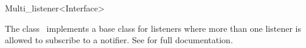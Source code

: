 

\begin{ccRefClass}{Multi_listener<Interface>}  %


\ccDefinition
  
The class \ccRefName\ implements a base class for listeners where more than one listener is allowed to subscribe to a notifier. See  for full documentation.



\end{ccRefClass}


